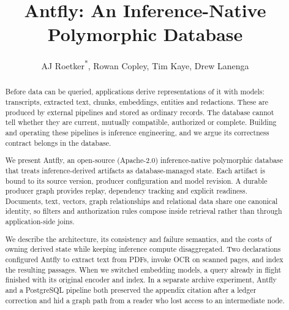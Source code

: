 \documentclass[sigconf,nonacm]{acmart}
\begin{document}
\title{Antfly: An Inference-Native Polymorphic Database}

\author{AJ Roetker\textsuperscript{*}, Rowan Copley, Tim Kaye, Drew Lanenga}

\renewcommand{\shortauthors}{Roetker et al.}

\begin{abstract}
Before data can be queried, applications derive representations of it with
models: transcripts, extracted text, chunks, embeddings, entities and
redactions. These are produced by external pipelines and stored as ordinary
records. The database cannot tell whether they are current, mutually
compatible, authorized or complete. Building and operating these pipelines is
inference engineering, and we argue its correctness contract belongs in the
database.

We present Antfly, an open-source (Apache-2.0) inference-native polymorphic
database that treats inference-derived artifacts as database-managed state.
Each artifact is bound to its source version, producer configuration and
model revision. A durable producer graph provides replay, dependency tracking
and explicit readiness. Documents, text, vectors, graph relationships and
relational data share one canonical identity, so filters and authorization
rules compose inside retrieval rather than through application-side joins.

We describe the architecture, its consistency and failure semantics, and the
costs of owning derived state while keeping inference compute disaggregated.
Two declarations configured Antfly to extract text from PDFs, invoke OCR on
scanned pages, and index the resulting passages. When we switched embedding
models, a query already in flight finished with its original encoder and
index. In a separate archive experiment, Antfly and a PostgreSQL pipeline
both preserved the appendix citation after a ledger correction and hid a
graph path from a reader who lost access to an intermediate node.
\end{abstract}

\maketitle
{\renewcommand{\thefootnote}{*}}
{\renewcommand{\thefootnote}{}}
\end{document}
